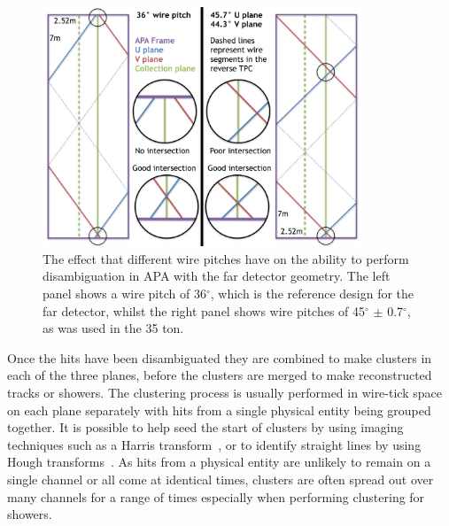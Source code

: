 \begin{figure}[h]
  \centering
  \includegraphics[width=0.85\textwidth]{WireAngleCondition}
  \caption[Performing disambiguation with different wire pitches.]
          {The effect that different wire pitches have on the ability to perform disambiguation in APA with the far detector geometry. The left panel shows a wire pitch of 36$^{\circ}$, which is the reference design for the far detector, whilst the right panel shows wire pitches of 45$^{\circ}$ $\pm$ 0.7$^{\circ}$, as was used in the 35 ton.}
  \label{fig:WirePitches}
\end{figure}

Once the hits have been disambiguated they are combined to make clusters in each of the three planes, before the clusters are merged to make reconstructed tracks or showers. The clustering process is usually performed in wire-tick space on each plane separately with hits from a single physical entity being grouped together. It is possible to help seed the start of clusters by using imaging techniques such as a Harris transform~\citep{HarrisTrans}, or to identify straight lines by using Hough transforms~\citep{HoughTrans}. As hits from a physical entity are unlikely to remain on a single channel or all come at identical times, clusters are often spread out over many channels for a range of times especially when performing clustering for showers. \\


